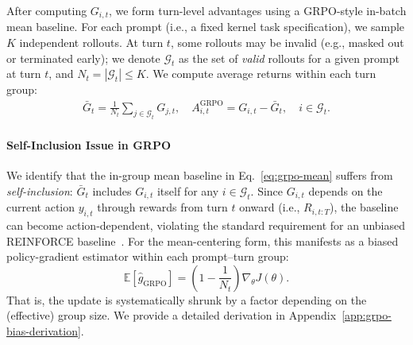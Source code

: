 After computing $G_{i,t}$, we form turn-level advantages using a GRPO-style in-batch mean baseline.
For each prompt (i.e., a fixed kernel task specification), we sample $K$ independent rollouts.
At turn $t$, some rollouts may be invalid (e.g., masked out or terminated early); we denote $\mathcal{G}_{t}$ as the set of \emph{valid} rollouts for a given prompt at turn $t$, and $N_{t}=|\mathcal{G}_{t}|\le K$.
We compute average returns within each turn group:
\begin{align}
\bar{G}_{t}
= \frac{1}{N_{t}}\sum_{j\in\mathcal{G}_{t}} G_{j,t}, \quad
A^{\text{GRPO}}_{i,t}
= G_{i,t}-\bar{G}_{t},\quad i\in\mathcal{G}_{t}.
\label{eq:grpo-mean}
\end{align}
\paragraph{Self-Inclusion Issue in GRPO}
We identify that the in-group mean baseline in Eq.~\eqref{eq:grpo-mean} suffers from \emph{self-inclusion}: $\bar G_{t}$ includes $G_{i,t}$ itself for any $i\in\mathcal{G}_{t}$. Since $G_{i,t}$ depends on the current action $y_{i,t}$ through rewards from turn $t$ onward (i.e., $R_{i,t:T}$), the baseline can become action-dependent, violating the standard requirement for an unbiased REINFORCE baseline~\citep{NIPS1999_464d828b,Sutton1998}. For the mean-centering form, this manifests as a biased policy-gradient estimator within each prompt--turn group:
\begin{equation}
\mathbb{E}[\hat g_{\text{GRPO}}]
=\left(1-\frac{1}{N_{t}}\right)\nabla_\theta J(\theta).
\label{eq:grpo-scale}
\end{equation}
That is, the update is systematically shrunk by a factor depending on the (effective) group size. We provide a detailed derivation in Appendix~\ref{app:grpo-bias-derivation}.
